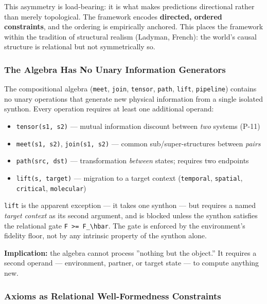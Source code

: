 \documentclass[12pt,a4paper]{article}
\begin{document}
This asymmetry is load-bearing: it is what makes predictions directional rather than merely topological. The framework encodes \textbf{directed, ordered constraints}, and the ordering is empirically anchored. This places the framework within the tradition of structural realism (Ladyman, French): the world's causal structure is relational but not symmetrically so.

\subsubsection{The Algebra Has No Unary Information Generators}

The compositional algebra (\texttt{meet}, \texttt{join}, \texttt{tensor}, \texttt{path}, \texttt{lift}, \texttt{pipeline}) contains no unary operations that generate new physical information from a single isolated synthon. Every operation requires at least one additional operand:

\begin{itemize}
    \item \texttt{tensor(s1, s2)} --- mutual information discount between \emph{two} systems (P-11)
    \item \texttt{meet(s1, s2)}, \texttt{join(s1, s2)} --- common sub/super-structures between \emph{pairs}
    \item \texttt{path(src, dst)} --- transformation \emph{between} states; requires two endpoints
    \item \texttt{lift(s, target)} --- migration to a target context (\texttt{temporal}, \texttt{spatial}, \texttt{critical}, \texttt{molecular})
\end{itemize}

\texttt{lift} is the apparent exception --- it takes one synthon --- but requires a named \emph{target context} as its second argument, and is blocked unless the synthon satisfies the relational gate \texttt{F \textgreater{}= F\_\textbackslash{}hbar}. The gate is enforced by the environment's fidelity floor, not by any intrinsic property of the synthon alone.

\textbf{Implication:} the algebra cannot process ''nothing but the object.'' It requires a second operand --- environment, partner, or target state --- to compute anything new.

\subsubsection{Axioms as Relational Well-Formedness Constraints}
\end{document}
